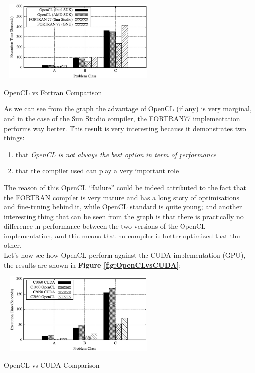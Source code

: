 \begin{figurehere}
 \centering
 \includegraphics[width=8cm, height=4cm]{./eps/OpenCLvsFORTRAN77.eps}
 \caption{OpenCL vs Fortran Comparison}
 \label{fig:OpenCLvsFORTRAN77}
\end{figurehere}

As we can see from the graph the advantage of OpenCL (if any) is very marginal, and in the case of the Sun Studio compiler, the FORTRAN77 implementation performs way better. This result is very interesting because it demonstrates two things:

\begin{enumerate}
	\item that \emph{OpenCL is not always the best option in term of performance}
	\item that the compiler used can play a very important role
\end{enumerate}

The reason of this OpenCL ``failure'' could be indeed attributed to the fact that the FORTRAN compiler is very mature and has a long story of optimizations and fine-tuning behind it, while OpenCL standard is quite young; and another interesting thing that can be seen from the graph is that there is practically no difference in performance between the two versions of the OpenCL implementation, and this means that no compiler is better optimized that the other.\\
Let's now see how OpenCL perform against the CUDA implementation (GPU), the results are shown in \textbf{Figure \ref{fig:OpenCLvsCUDA}}:\\

\begin{figurehere}
 \centering
 \includegraphics[width=8cm, height=4cm]{./eps/OpenCLvsCUDA.eps}
 \caption{OpenCL vs CUDA Comparison}
 \label{fig:OpenCLvsCUDA}
\end{figurehere}

